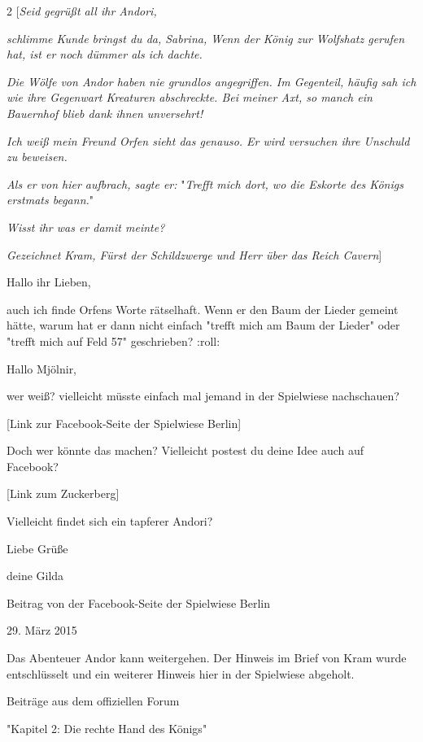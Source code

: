 \documentclass[10pt, a4paper, oneside]{book}
\begin{document}
\begin{multicols}{2}
[\textit{Seid gegrüßt all ihr Andori,}

\textit{schlimme Kunde bringst du da, Sabrina, Wenn der König zur Wolfshatz gerufen hat, ist er noch dümmer als ich dachte.}

\textit{Die Wölfe von Andor haben nie grundlos angegriffen. Im Gegenteil, häufig sah ich wie ihre Gegenwart Kreaturen abschreckte. Bei meiner Axt, so manch ein Bauernhof blieb dank ihnen unversehrt!}

\textit{Ich weiß mein Freund Orfen sieht das genauso. Er wird versuchen ihre Unschuld zu beweisen.}

\textit{Als er von hier aufbrach, sagte er:} "\textit{Trefft mich dort, wo die Eskorte des Königs erstmats begann.}"

\textit{Wisst ihr was er damit meinte?}

\textit{Gezeichnet Kram, Fürst der Schildzwerge und Herr über das Reich Cavern}]

Hallo ihr Lieben,

auch ich finde Orfens Worte rätselhaft. Wenn er den Baum der Lieder gemeint hätte, warum hat er dann nicht einfach "trefft mich am Baum der Lieder" oder "trefft mich auf Feld 57" geschrieben? :roll:

Hallo Mjölnir,

wer weiß? vielleicht müsste einfach mal jemand in der Spielwiese nachschauen?

[Link zur Facebook-Seite der Spielwiese Berlin]

Doch wer könnte das machen? Vielleicht postest du deine Idee auch auf Facebook?

[Link zum Zuckerberg]

Vielleicht findet sich ein tapferer Andori?

Liebe Grüße

deine Gilda

\begin{center}
    Beitrag von der Facebook-Seite der Spielwiese Berlin

    29. März 2015
\end{center}

Das Abenteuer Andor kann weitergehen. Der Hinweis im Brief von Kram wurde entschlüsselt und ein weiterer Hinweis hier in der Spielwiese abgeholt.


\begin{center}
    Beiträge aus dem offiziellen Forum

    "Kapitel 2: Die rechte Hand des Königs"


\end{center}
\end{multicols}
\end{document}
